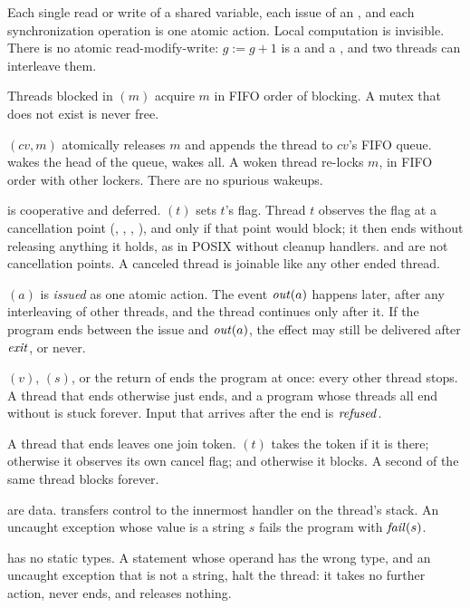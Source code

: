 \begin{description}[leftmargin=1.2em,itemsep=3pt]
\item[Atomic actions.] Each single read or write of a shared variable, each
  issue of an , and each synchronization operation is one atomic
  action. Local computation is invisible. There is no atomic
  read-modify-write: $g := g + 1$ is a  and a , and two
  threads can interleave them.
\item[Mutexes.] Threads blocked in $(m)$ acquire $m$ in FIFO order
  of blocking. A mutex that does not exist is never free.
\item[Condition variables.] $(\mathit{cv}, m)$ atomically releases
  $m$ and appends the thread to $\mathit{cv}$'s FIFO queue. 
  wakes the head of the queue,  wakes all. A woken thread
  re-locks $m$, in FIFO order with other lockers. There are no spurious
  wakeups.
\item[Cancellation] is cooperative and deferred. $(t)$ sets
  $t$'s flag. Thread $t$ observes the flag at a cancellation point
  (, , , ), and only if that point
  would block; it then ends without releasing anything it holds, as in POSIX
  without cleanup handlers.  and  are not cancellation
  points. A canceled thread is joinable like any other ended thread.
\item[Emit is asynchronous.] $(a)$ is \emph{issued} as one atomic
  action. The event $\mathit{out}(a)$ happens later, after any interleaving of
  other threads, and the thread continues only after it. If the program
  ends between the issue and $\mathit{out}(a)$, the effect may still be
  delivered after $\mathit{exit}$, or never.
\item[Exit.] $(v)$, $(s)$, or the return of 
  ends the program at once: every other thread stops. A thread that ends
  otherwise just ends, and a program whose threads all end without
   is stuck forever. Input that arrives after the end is
  $\mathit{refused}$.
\item[Join.] A thread that ends leaves one join token. $(t)$ takes
  the token if it is there; otherwise it observes its own cancel flag; and
  otherwise it blocks. A second  of the same thread blocks
  forever.
\item[Exceptions] are data.  transfers control to the innermost
  handler on the thread's stack. An uncaught exception whose value is a
  string $s$ fails the program with $\mathit{fail}(s)$.
\item[Halting.] \Lang{} has no static types. A statement whose operand has
  the wrong type, and an uncaught exception that is not a string, halt the
  thread: it takes no further action, never ends, and releases nothing.
\end{description}

